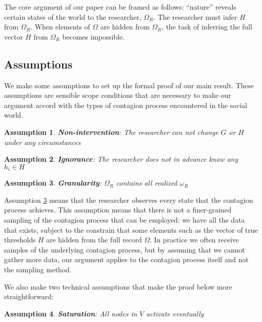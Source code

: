 \documentclass[a4paper]{article}
\newtheorem{assn}{Assumption}
\begin{document}
The core argument of our paper can be framed as follows: ``nature'' reveals certain states of the world to the researcher, $\Omega_R$. The researcher must infer $H$ from $\Omega_R$. When elements of $\Omega$ are hidden from $\Omega_R$, the task of inferring the full vector $H$ from $\Omega_R$ becomes impossible.

\subsection{Assumptions}

We make some assumptions to set up the formal proof of our main result. These assumptions are sensible scope conditions that are necessary to make our argument accord with the types of contagion process encountered in the social world.

\begin{assn} \label{assn:immutability}
\textbf{Non-intervention}: The researcher can not change $G$ or $H$ under any circumstances
\end{assn}

\begin{assn} \label{assn:ignorance}
\textbf{Ignorance}: The researcher does not in advance know any $h_i \in H$
\end{assn}

\begin{assn} \label{assn:perfect_obs}
\textbf{Granularity}: $\Omega_R$ contains all realized $\omega_R$
\end{assn}

\noindent
Assumption \ref{assn:perfect_obs} means that the researcher observes every state that the contagion process achieves. This assumption means that there is not a finer-grained sampling of the contagion process that can be employed: we have all the data that exists, subject to the constrain that some elements such as the vector of true thresholds $H$ are hidden from the full record $\Omega$. In practice we often receive samples of the underlying contagion process, but by assuming that we cannot gather more data, our argument applies to the contagion process itself and not the sampling method.

We also make two technical assumptions that make the proof below more straightforward:

\begin{assn} \label{assn:saturation}
\textbf{Saturation}: All nodes in $V$ activate eventually
\end{assn}
\end{document}
